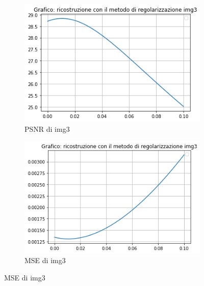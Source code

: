 \begin{figure}[H]
    \begin{subfigure}{0.5\textwidth}
        \centering
        \includegraphics[width=\textwidth]{output/PSNR/outputPSNR-img3.png}
        \caption{PSNR di img3}
        \label{fig:img3PSNR}
    \end{subfigure}\hfill
    \begin{subfigure}{0.5\textwidth}
        \centering
        \includegraphics[width=\textwidth]{output/MSE/outputMSE-img3.png}
        \caption{MSE di img3}
        \label{fig:img3MSE}
    \end{subfigure}


\end{figure}
